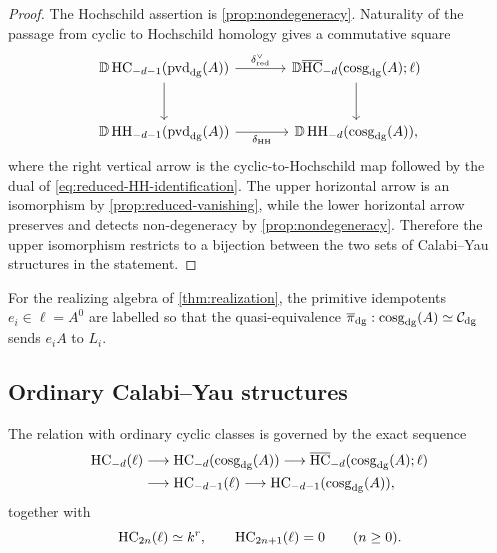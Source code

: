 \documentclass[11pt,a4paper,dvipsnames,x11names]{amsart}
\begin{document}
\begin{proof}
The Hochschild assertion is \cref{prop:nondegeneracy}. Naturality of the passage from cyclic to Hochschild homology gives a commutative square
\[
\begin{tikzcd}[column sep=large,row sep=large]
\DD\HChom_{-d-1}(\pvd_{\dg}(A)) \ar[r,"\delta_{\mathrm{red}}^\vee"] \ar[d] & \DD\overline{\HChom}_{-d}(\cosg_{\dg}(A);\ell) \ar[d] \\
\DD\HHom_{-d-1}(\pvd_{\dg}(A)) \ar[r,"\delta_{\mathrm{HH}}"'] & \DD\HHom_{-d}(\cosg_{\dg}(A)),
\end{tikzcd}
\]
where the right vertical arrow is the cyclic-to-Hochschild map followed by the dual of \eqref{eq:reduced-HH-identification}. The upper horizontal arrow is an isomorphism by \cref{prop:reduced-vanishing}, while the lower horizontal arrow preserves and detects non-degeneracy by \cref{prop:nondegeneracy}. Therefore the upper isomorphism restricts to a bijection between the two sets of Calabi--Yau structures in the statement.
\end{proof}

For the realizing algebra of \cref{thm:realization}, the primitive idempotents $e_i\in\ell=A^0$ are labelled so that the quasi-equivalence $\overline\pi_{\mathrm{dg}}:\operatorname{cosg}_{\mathrm{dg}}(A)\simeq\mathcal C_{\mathrm{dg}}$ sends $e_iA$ to $L_i$.

\subsection{Ordinary Calabi--Yau structures}

The relation with ordinary cyclic classes is governed by the exact sequence
\begin{equation}\label{eq:ordinary-reduced-sequence}
\begin{aligned}
\operatorname{HC}_{-d}(\ell)&\longrightarrow\operatorname{HC}_{-d}(\operatorname{cosg}_{\mathrm{dg}}(A))\longrightarrow\overline{\operatorname{HC}}_{-d}(\operatorname{cosg}_{\mathrm{dg}}(A);\ell)\\
&\longrightarrow\operatorname{HC}_{-d-1}(\ell)\longrightarrow\operatorname{HC}_{-d-1}(\operatorname{cosg}_{\mathrm{dg}}(A)),
\end{aligned}
\end{equation}
together with
\begin{equation}\label{eq:semisimple-cyclic}
\operatorname{HC}_{2n}(\ell)\simeq k^r,\qquad \operatorname{HC}_{2n+1}(\ell)=0\qquad(n\geq0).
\end{equation}
\end{document}
